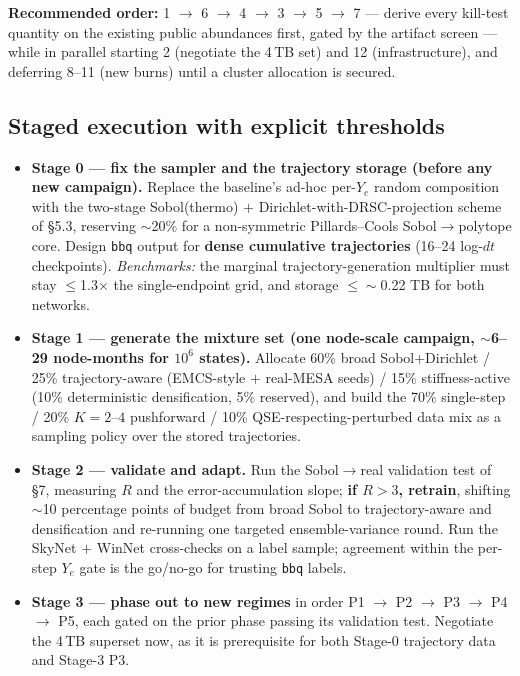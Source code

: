 \documentclass[11pt]{article}
\newcommand{\bbq}{\texttt{bbq}}
\begin{document}
\textbf{Recommended order:} 1 $\to$ 6 $\to$ 4 $\to$ 3 $\to$ 5 $\to$ 7 --- derive every kill-test quantity on the existing public abundances first, gated by the artifact screen --- while in parallel starting 2 (negotiate the 4\,TB set) and 12 (infrastructure), and deferring 8--11 (new burns) until a cluster allocation is secured.

\subsection{Staged execution with explicit thresholds}

\begin{itemize}
\item \textbf{Stage 0 --- fix the sampler and the trajectory storage (before any new campaign).} Replace the baseline's ad-hoc per-$Y_e$ random composition with the two-stage Sobol(thermo) $+$ Dirichlet-with-DRSC-projection scheme of \S5.3, reserving $\sim$20\% for a non-symmetric Pillards--Cools Sobol$\to$polytope core. Design \bbq{} output for \textbf{dense cumulative trajectories} (16--24 log-$dt$ checkpoints). \emph{Benchmarks:} the marginal trajectory-generation multiplier must stay $\le$1.3$\times$ the single-endpoint grid, and storage $\le\sim$0.22 TB for both networks.
\item \textbf{Stage 1 --- generate the mixture set (one node-scale campaign, $\sim$6--29 node-months for $10^6$ states).} Allocate 60\% broad Sobol+Dirichlet / 25\% trajectory-aware (EMCS-style $+$ real-MESA seeds) / 15\% stiffness-active (10\% deterministic densification, 5\% reserved), and build the 70\% single-step / 20\% $K = 2$--$4$ pushforward / 10\% QSE-respecting-perturbed data mix as a sampling policy over the stored trajectories.
\item \textbf{Stage 2 --- validate and adapt.} Run the Sobol$\to$real validation test of \S7, measuring $R$ and the error-accumulation slope; \textbf{if $R > 3$, retrain}, shifting $\sim$10 percentage points of budget from broad Sobol to trajectory-aware and densification and re-running one targeted ensemble-variance round. Run the SkyNet $+$ WinNet cross-checks on a label sample; agreement within the per-step $Y_e$ gate is the go/no-go for trusting \bbq{} labels.
\item \textbf{Stage 3 --- phase out to new regimes} in order P1 $\to$ P2 $\to$ P3 $\to$ P4 $\to$ P5, each gated on the prior phase passing its validation test. Negotiate the 4\,TB superset now, as it is prerequisite for both Stage-0 trajectory data and Stage-3 P3.
\end{itemize}
\end{document}
